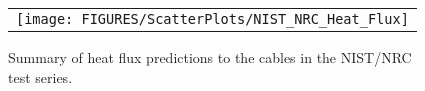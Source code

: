 \begin{figure}[p]
\begin{center}
\begin{tabular}{c}
\texttt{[image: FIGURES/ScatterPlots/NIST\_NRC\_Heat\_Flux]}
\end{tabular}
\end{center}
\caption[Summary of heat flux predictions to cables, NIST/NRC test series.]
{Summary of heat flux predictions to the cables in the NIST/NRC test series.}
\end{figure}
